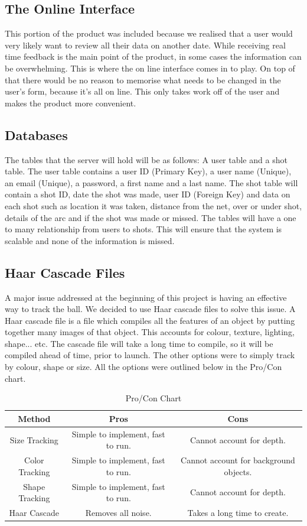 \subsection{The Online Interface}
This portion of the product was included because we realised that a user would very likely want to review all their data on another date. While receiving real time feedback is the main point of the product, in some cases the information can be overwhelming. This is where the on line interface comes in to play. On top of that there would be no reason to memorise what needs to be changed in the user's form, because it's all on line. This only takes work off of the user and makes the product more convenient.

\subsection{Databases}
The tables that the server will hold will be as follows: A user table and a shot table. The user table contains a user ID (Primary Key), a user name (Unique), an email (Unique), a password, a first name and a last name. The shot table will contain a shot ID, date the shot was made, user ID (Foreign Key) and data on each shot such as location it was taken, distance from the net, over or under shot, details of the arc and if the shot was made or missed. The tables will have a one to many relationship from users to shots. This will ensure that the system is scalable and none of the information is missed.

\subsection{Haar Cascade Files}
A major issue addressed at the beginning of this project is having an effective way to track the ball. We decided to use Haar cascade files to solve this issue. A Haar cascade file is a file which compiles all the features of an object by putting together many images of that object. This accounts for colour, texture, lighting, shape... etc. The cascade file will take a long time to compile, so it will be compiled ahead of time, prior to launch. The other options were to simply track by colour, shape or size. All the options were outlined below in the Pro/Con chart.\\

\begin{table}[h!]
  \centering
  \caption{Pro/Con Chart}
  \label{tab:table5}
  \begin{tabular}{ccc}
    \toprule
    Method & Pros & Cons\\
    \midrule
    Size Tracking & Simple to implement, fast to run. & Cannot account for depth.\\
    Color Tracking & Simple to implement, fast to run. & Cannot account for background objects.\\
    Shape Tracking & Simple to implement, fast to run. & Cannot account for depth.\\
    Haar Cascade & Removes all noise. & Takes a long time to create.\\
    \bottomrule
  \end{tabular}
\end{table}


